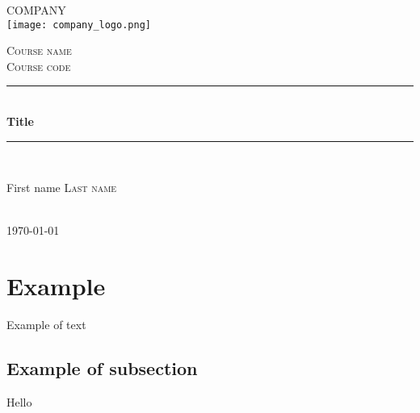\documentclass[a4paper]{article} %
\newcommand{\HRule}{\rule{\linewidth}{0.5mm}} %
\begin{document}
    \begin{titlepage}
        \centering
        \textsc{\LARGE COMPANY}\\[1.5cm] %
        \texttt{[image: company\_logo.png]}\par\vspace{1cm} %
        \textsc{\Large Course name}\\[0.5cm] %
        \textsc{\large Course code}\\[0.5cm] %
        \HRule \\[0.4cm]
        {\huge \bfseries Title}\\[0.4cm] %
        \HRule \\[1.5cm]
        \begin{minipage}{0.75\textwidth}
        \begin{flushleft} \large
            \centering
            First name \textsc{Last name}\\ %
        \end{flushleft}
        \end{minipage}\\[2cm]
        {\large \today}\\[2cm] %
        \vfill %
        
    \clearpage
    \end{titlepage}

    \setlength{\headheight}{41.75pt}
    \fancyhf
    \fancyhead{\ }
    \renewcommand{\headrulewidth}{3pt} %

    \tableofcontents
    \clearpage

    \section{Example}
    Example of text
        \subsection{Example of subsection}
        Hello
\end{document}
